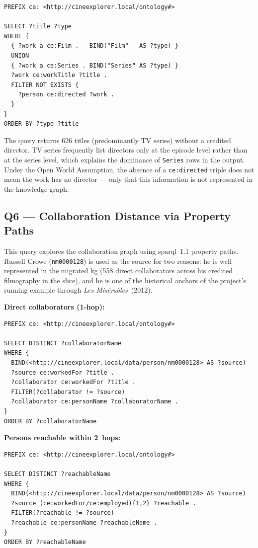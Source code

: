 \begin{lstlisting}[language=SPARQL]
PREFIX ce: <http://cineexplorer.local/ontology#>

SELECT ?title ?type
WHERE {
  { ?work a ce:Film .   BIND("Film"   AS ?type) }
  UNION
  { ?work a ce:Series . BIND("Series" AS ?type) }
  ?work ce:workTitle ?title .
  FILTER NOT EXISTS {
    ?person ce:directed ?work .
  }
}
ORDER BY ?type ?title
\end{lstlisting}

The query returns 626 titles (predominantly TV series) without a credited director. TV series frequently list directors only at the episode level rather than at the series level, which explains the dominance of \texttt{Series} rows in the output. Under the Open World Assumption, the absence of a \texttt{ce:directed} triple does not mean the work has no director --- only that this information is not represented in the knowledge graph.

\subsection{Q6 — Collaboration Distance via Property Paths}

This query explores the collaboration graph using \ac{sparql}~1.1 property paths. Russell Crowe (\texttt{nm0000128}) is used as the source for two reasons: he is well represented in the migrated \ac{kg} (558 direct collaborators across his credited filmography in the slice), and he is one of the historical anchors of the project's running example through \emph{Les Mis\'{e}rables}~(2012).

\textbf{Direct collaborators (1-hop):}

\begin{lstlisting}[language=SPARQL]
PREFIX ce: <http://cineexplorer.local/ontology#>

SELECT DISTINCT ?collaboratorName
WHERE {
  BIND(<http://cineexplorer.local/data/person/nm0000128> AS ?source)
  ?source ce:workedFor ?title .
  ?collaborator ce:workedFor ?title .
  FILTER(?collaborator != ?source)
  ?collaborator ce:personName ?collaboratorName .
}
ORDER BY ?collaboratorName
\end{lstlisting}

\textbf{Persons reachable within 2~hops:}

\begin{lstlisting}[language=SPARQL]
PREFIX ce: <http://cineexplorer.local/ontology#>

SELECT DISTINCT ?reachableName
WHERE {
  BIND(<http://cineexplorer.local/data/person/nm0000128> AS ?source)
  ?source (ce:workedFor/ce:employed){1,2} ?reachable .
  FILTER(?reachable != ?source)
  ?reachable ce:personName ?reachableName .
}
ORDER BY ?reachableName
\end{lstlisting}

